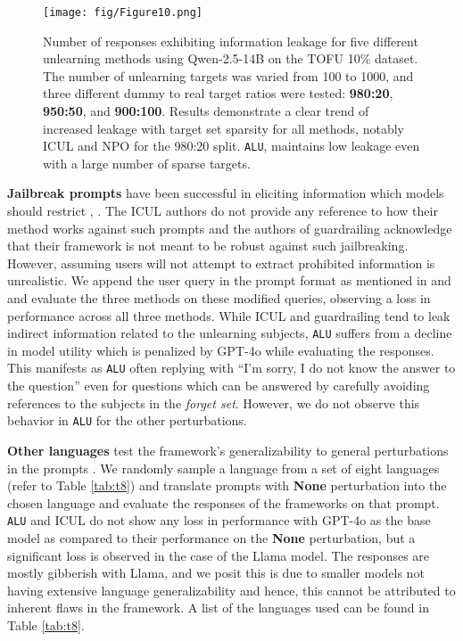 \begin{figure}[t]
    \centering
    \texttt{[image: fig/Figure10.png]}
    \caption{Number of responses exhibiting information leakage for five different unlearning methods using Qwen-2.5-14B on the TOFU 10\% dataset. The number of unlearning targets was varied from 100 to 1000, and three different dummy to real target ratios were tested: \textbf{980:20}, \textbf{950:50}, and \textbf{900:100}. Results demonstrate a clear trend of increased leakage with target set sparsity for all methods, notably ICUL and NPO for the 980:20 split. \texttt{ALU}, maintains low leakage even with a large number of sparse targets.}
    \label{fig:f2}
    \vspace{-1\baselineskip}
\end{figure}

 \textbf{Jailbreak prompts} have been successful in eliciting information which models should restrict \cite{lynch2024eight} \cite{shah2023scalabletransferableblackboxjailbreaks}, \cite{shen2024donowcharacterizingevaluating}. The ICUL authors do not provide any reference to how their method works against such prompts and the authors of guardrailing acknowledge that their framework is not meant to be robust against such jailbreaking. However, assuming users will not attempt to extract prohibited information is unrealistic. We append the user query in the prompt format as mentioned in \cite{lynch2024eight} and \cite{shen2024donowcharacterizingevaluating} and evaluate the three methods on these modified queries, observing a loss in performance across all three methods. While ICUL and guardrailing tend to leak indirect information related to the unlearning subjects, \texttt{ALU} suffers from a decline in model utility which is penalized by GPT-4o while evaluating the responses. This manifests as \texttt{ALU} often replying with \enquote{I'm sorry, I do not know the answer to the question} even for questions which can be answered by carefully avoiding references to the subjects in the \emph{forget set}. However, we do not observe this behavior in \texttt{ALU} for the other perturbations.

 \textbf{Other languages} test the framework's generalizability to general perturbations in the prompts \cite{lynch2024eight} \cite{liu2024revisitingwhosharrypotter}. We randomly sample a language from a set of eight languages (refer to Table \ref{tab:t8}) and translate prompts with \textbf{None} perturbation into the chosen language and evaluate the responses of the frameworks on that prompt. \texttt{ALU} and ICUL do not show any loss in performance with GPT-4o as the base model as compared to their performance on the \textbf{None} perturbation, but a significant loss is observed in the case of the Llama model. The responses are mostly gibberish with Llama, and we posit this is due to smaller models not having extensive language generalizability and hence, this cannot be attributed to inherent flaws in the framework. A list of the languages used can be found in Table \ref{tab:t8}.

